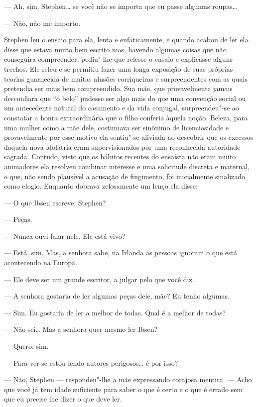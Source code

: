 --- Ah, sim, Stephen\ldots{} se você não se importa que eu passe
algumas roupas\ldots{}

--- Não, não me importo.

Stephen leu o ensaio para ela, lenta e enfaticamente, e quando
acabou de ler ela disse que estava muito bem escrito mas, havendo
algumas coisas que não conseguira compreender, pediu"-lhe que relesse o
ensaio e explicasse alguns trechos.  Ele releu e se permitiu fazer uma
longa exposição de suas próprias teorias \label{guarnecida"-de} guarnecida de muitas alusões
corriqueiras e surpreendentes com as quais pretendia ser mais bem
compreendido.  Sua mãe, que provavelmente jamais desconfiara que “o
belo” pudesse ser algo mais do que uma convenção social ou um
antecedente natural do casamento e da vida conjugal, surpreendeu"-se ao
constatar a honra extraordinária que o filho conferia àquela noção.
Beleza, para uma mulher como a mãe dele, costumava ser sinônimo de
licenciosidade e provavelmente por esse motivo ela sentiu"-se aliviada
ao descobrir que os excessos daquela nova idolatria eram
supervisionados por uma reconhecida autoridade sagrada.  Contudo, visto
que os hábitos recentes do ensaísta não eram muito animadores ela
resolveu combinar interesse e uma solicitude discreta e maternal, o
que, não sendo plausível a acusação de fingimento, foi inicialmente
sinalizado como elogio.  Enquanto dobrava zelosamente um lenço ela disse:
	
--- O que Ibsen escreve, Stephen?

--- Peças.

--- Nunca ouvi falar nele.  Ele está vivo?

--- Está, sim.  Mas, a senhora sabe, na Irlanda as pessoas
ignoram o que está acontecendo na Europa.

--- Ele deve ser um grande escritor, a julgar pelo que você diz.

--- A senhora gostaria de ler algumas peças dele, mãe?  Eu tenho
algumas.

--- Sim.  Eu gostaria de ler a melhor de todas.  Qual é a melhor
de todas?

--- Não sei\ldots{}  Mas a senhora quer mesmo ler Ibsen?

--- Quero, sim.

--- Para ver se estou lendo autores perigosos\ldots{} é por isso?

--- Não, Stephen --- respondeu"-lhe a mãe expressando corajosa
mentira.  --- Acho que você já tem idade suficiente para saber o que é
certo e o que é errado sem que eu precise lhe dizer o que deve ler.

